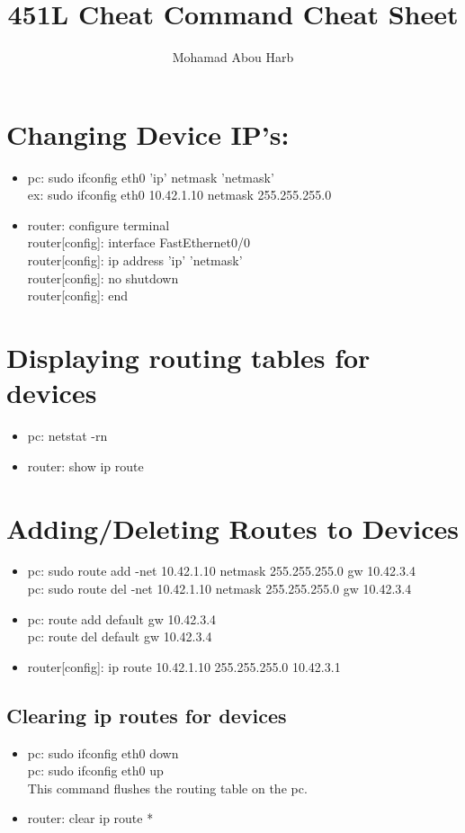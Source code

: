 \documentclass[12pt]{article}
\title{451L Cheat Command Cheat Sheet}
\author{Mohamad Abou Harb}
\begin{document}
\maketitle
\tableofcontents
\newpage
\section{Changing Device IP's:}
\begin{itemize}
    \item pc: sudo ifconfig eth0 'ip' netmask 'netmask'\\
          ex: sudo ifconfig eth0 10.42.1.10 netmask 255.255.255.0
    \item router: configure terminal\\
          router[config]: interface FastEthernet0/0\\
          router[config]: ip address 'ip' 'netmask'\\
          router[config]: no shutdown\\
          router[config]: end\\
\end{itemize}
\newpage

\section{Displaying routing tables for devices}
\begin{itemize}
    \item pc: netstat -rn
    \item router: show ip route
\end{itemize}
\newpage
\section{Adding/Deleting Routes to Devices}
\begin{itemize}
    \item pc: sudo route add -net 10.42.1.10 netmask 255.255.255.0 gw 10.42.3.4\\
          pc: sudo route del -net 10.42.1.10 netmask 255.255.255.0 gw 10.42.3.4
    \item pc: route add default gw 10.42.3.4\\
          pc: route del default gw 10.42.3.4
    \item router[config]: ip route 10.42.1.10 255.255.255.0 10.42.3.1
\end{itemize}
\subsection{Clearing ip routes for devices}
\begin{itemize}
    \item pc: sudo ifconfig eth0 down\\
          pc: sudo ifconfig eth0 up\\
          This command flushes the routing table on the pc.
    \item router: clear ip route *
\end{itemize}
\end{document}
